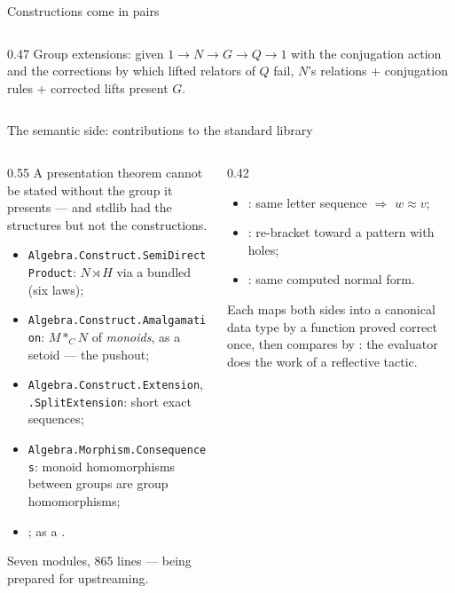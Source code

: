 \begin{frame}{Constructions come in pairs \InPaper}
\begin{columns}[c]
\begin{column}{0.47\textwidth}
\vspace{8pt}
{\small Group \alert{extensions}: given $1\to N\to G\to Q\to 1$ with the
conjugation action and the corrections by which lifted relators of $Q$ fail,
$N$'s relations + conjugation rules + corrected lifts present $G$.}

\vspace{4pt}
\end{column}
\end{columns}
\end{frame}

\begin{frame}{The semantic side: contributions to the standard library \InPaper}
\begin{columns}[c]
\begin{column}{0.55\textwidth}
A presentation theorem cannot be stated without the group it presents --- and
stdlib had the structures but not the \alert{constructions}.
\begin{itemize}
  \setlength{\itemsep}{2pt}
  \item \texttt{Algebra.Construct.SemiDirectProduct}: $N\rtimes H$ via a
        bundled  (six laws);
  \item \texttt{Algebra.Construct.Amalgamation}: $M\ast_C N$ of
        \emph{monoids}, as a setoid --- the pushout;
  \item \texttt{Algebra.Construct.Extension}, \texttt{.SplitExtension}:
        short exact sequences;
  \item \texttt{Algebra.Morphism.Consequences}: monoid homomorphisms between
        groups are group homomorphisms;
  \item {};\;  as a .
\end{itemize}
\small Seven modules, 865 lines --- being prepared for upstreaming.
\end{column}
\begin{column}{0.42\textwidth}
\begin{keybox}[title={Solvers by evaluation, not reflection}]
\small
\begin{itemize}
  \item {}: same letter sequence $\Rightarrow$ $w\approx v$;
  \item {}: re-bracket toward a pattern with holes;
  \item {}: same computed normal form.
\end{itemize}
Each maps both sides into a canonical data type by a function proved
correct once, then compares by : the evaluator does the work of
a reflective tactic.
\end{keybox}
\end{column}
\end{columns}
\end{frame}
